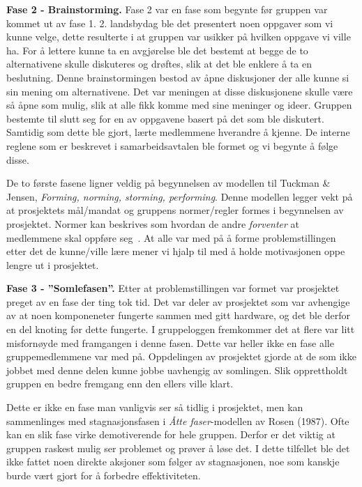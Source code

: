 

\noindent \textbf{\Large Fase 2 - Brainstorming.}
Fase 2 var en fase som begynte før gruppen var kommet ut av fase 1. 
2. landsbydag ble det presentert noen oppgaver som vi kunne velge, dette resulterte i at gruppen var usikker på hvilken oppgave vi ville ha. 
For å lettere kunne ta en avgjørelse ble det bestemt at begge de to alternativene skulle diskuteres og drøftes, slik at det ble enklere å ta en beslutning. 
Denne brainstormingen bestod av åpne diskusjoner der alle kunne si sin mening om alternativene. 
Det var meningen at disse diskusjonene skulle være så åpne som mulig, slik at alle fikk komme med sine meninger og ideer. 
Gruppen bestemte til slutt seg for en av oppgavene basert på det som ble diskutert. 
Samtidig som dette ble gjort, lærte medlemmene hverandre å kjenne. 
De interne reglene som er beskrevet i samarbeidsavtalen ble formet og vi begynte å følge disse. 

De to første fasene ligner veldig på begynnelsen av modellen til Tuckman \& Jensen, \textit{Forming, norming, storming, performing}. 
Denne modellen legger vekt på at prosjektets mål/mandat og gruppens normer/regler formes i begynnelsen av prosjektet. 
Normer kan beskrives som hvordan de andre \textit{forventer} at medlemmene skal oppføre seg~\citep{schwarz}. 
At alle var med på å forme problemstillingen etter det de kunne/ville lære mener vi hjalp til med å holde motivasjonen oppe lengre ut i prosjektet. 
\vspace{\secspace}

\noindent \textbf{\Large Fase 3 - ''Somlefasen''.}
Etter at problemstillingen var formet var prosjektet preget av en fase der ting tok tid. 
Det var deler av prosjektet som var avhengige av at noen komponeneter fungerte sammen med gitt hardware, og det ble derfor en del knoting før dette fungerte.  
I gruppeloggen fremkommer det at flere var litt misfornøyde med framgangen i denne fasen. 
Dette var heller ikke en fase alle gruppemedlemmene var med på. 
Oppdelingen av prosjektet gjorde at de som ikke jobbet med denne delen kunne jobbe uavhengig av somlingen. 
Slik opprettholdt gruppen en bedre fremgang enn den ellers ville klart. 

Dette er ikke en fase man vanligvis ser så tidlig i prosjektet, men kan sammenlinges med stagnasjonsfasen i \textit{Åtte faser}-modellen av Rosen (1987).
Ofte kan en slik fase virke demotiverende for hele gruppen. 
Derfor er det viktig at gruppen raskest mulig ser problemet og prøver å løse det. 
I dette tilfellet ble det ikke fattet noen direkte aksjoner som følger av stagnasjonen, noe som kanskje burde vært gjort for å forbedre effektiviteten. 
\vspace{\secspace}

